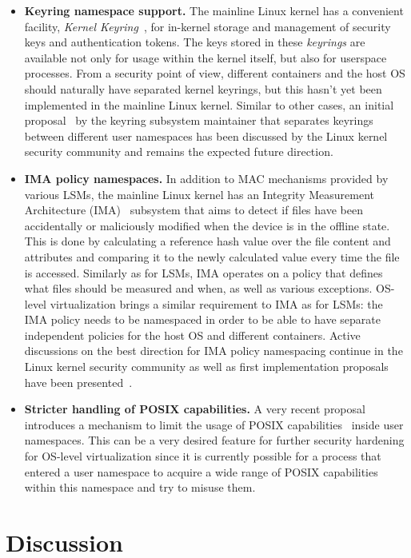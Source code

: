 \begin{itemize}
  \item \textbf{Keyring namespace support.} The mainline Linux kernel has a convenient facility, \textit{Kernel Keyring}~\cite{keyrings}, for in-kernel storage and management of security keys and authentication tokens. The keys stored in these \textit{keyrings} are available not only for usage within the kernel itself, but also for userspace processes. From a security point of view, different containers and the host OS should naturally have separated kernel keyrings, but this hasn't yet been implemented in the mainline Linux kernel. Similar to other cases, an initial proposal~\cite{howells2016} by the keyring subsystem maintainer that separates keyrings between different user namespaces has been discussed by the Linux kernel security community and remains the expected future direction. 
	\item \textbf{IMA policy namespaces.} In addition to MAC mechanisms provided by various LSMs, the mainline Linux kernel has an Integrity Measurement Architecture (IMA)~\cite{ima} subsystem that aims to detect if files have been accidentally or maliciously modified when the device is in the offline state. This is done by calculating a reference hash value over the file content and attributes and comparing it to the newly calculated value every time the file is accessed. Similarly as for LSMs, IMA operates on a policy that defines what files should be measured and when, as well as various exceptions. OS-level virtualization brings a similar requirement to IMA as for LSMs: the IMA policy needs to be namespaced in order to be able to have separate independent policies for the host OS and different containers. Active discussions on the best direction for IMA policy namespacing continue in the Linux kernel security community as well as first implementation proposals have been presented~\cite{magalhaes2017}. 
	\item \textbf{Stricter handling of POSIX capabilities.} A very recent proposal~\cite{Bandewar2017} introduces a mechanism to limit the usage of POSIX capabilities~\cite{caps} inside user namespaces. This can be a very desired feature for further security hardening for OS-level virtualization since it is currently possible for a process that entered a user namespace to acquire a wide range of POSIX capabilities within this namespace and try to misuse them. 
\end{itemize}


\section{Discussion}

